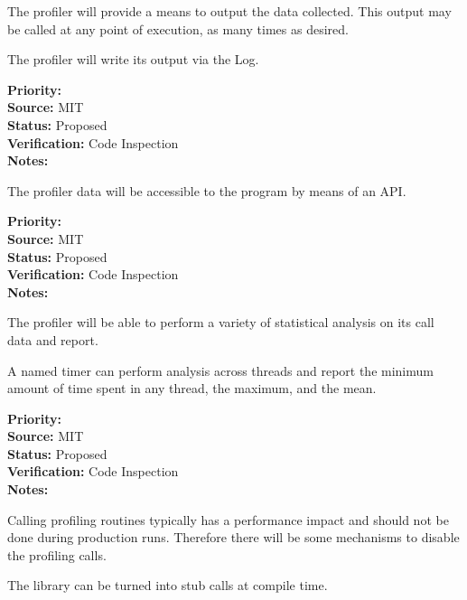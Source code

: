 The profiler will provide a means to output the data collected.  This output may
be called at any point of execution, as many times as desired.


The profiler will write its output via the Log.  

\begin{reqlist}
{\bf Priority:}  \\
{\bf Source:}  MIT \\
{\bf Status:} Proposed \\
{\bf Verification:} Code Inspection \\
{\bf Notes:} 
\end{reqlist}


The profiler data will be accessible to the program by means of an API.
\begin{reqlist}
{\bf Priority:}  \\
{\bf Source:} MIT  \\
{\bf Status:} Proposed \\
{\bf Verification:} Code Inspection \\
{\bf Notes:} 
\end{reqlist}


The profiler will be able to perform a variety of statistical analysis on its call
data and report.


A named timer can perform analysis across threads and report the 
minimum amount of time spent in any thread, the maximum, and the mean.

\begin{reqlist}
{\bf Priority:}  \\
{\bf Source:}  MIT \\
{\bf Status:} Proposed \\
{\bf Verification:} Code Inspection \\
{\bf Notes:} 
\end{reqlist}


Calling profiling routines typically has a performance impact and should not
be done during production runs.  Therefore there will be some mechanisms to 
disable the profiling calls.


The library can be turned into stub calls at compile time.


